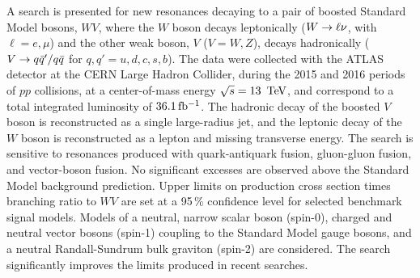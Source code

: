 
A search is presented for new resonances decaying to a pair of boosted Standard Model bosons, $WV$, where the $W$ boson decays leptonically ($W\rightarrow\ell\nu$, with $\ell=e,\mu$) and the other weak boson, $V$ ($V=W,Z$), decays hadronically ($V\rightarrow q\bar{q}'/q\bar{q}$ for $q,q'=u,d,c,s,b$).  The data were collected with the ATLAS detector at the CERN Large Hadron Collider, during the 2015 and 2016 periods of $pp$ collisions, at a center-of-mass energy $\sqrt{s}=13\,\TeV$, and correspond to a total integrated luminosity of $36.1\,\mbox{fb$^{-1}$}$.  
The hadronic decay of the boosted $V$ boson is reconstructed as a single large-radius jet, and the leptonic decay of the $W$ boson is reconstructed as a lepton and missing transverse energy. The search is sensitive to resonances produced with quark-antiquark fusion, gluon-gluon fusion, and vector-boson fusion.  No significant excesses are observed above the Standard Model background prediction. Upper limits on production cross section times branching ratio to $WV$ are set at a 95\,\% confidence level for selected benchmark signal models. Models of a neutral, narrow scalar boson (spin-0), charged and neutral vector bosons (spin-1) coupling to the Standard Model gauge bosons, and a neutral Randall-Sundrum bulk graviton (spin-2) are considered. The search significantly improves the limits produced in recent searches. 
